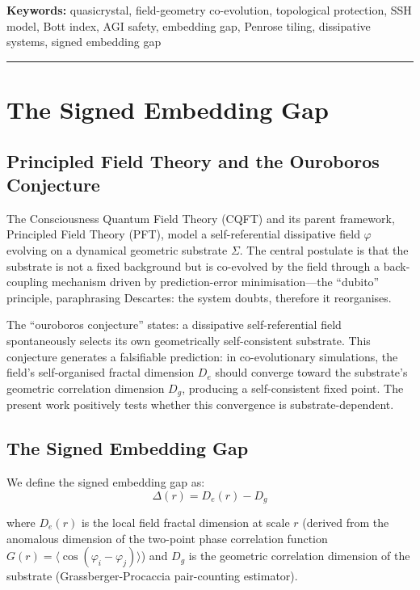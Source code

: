 \documentclass[11pt,a4paper]{article}
\begin{document}
\vspace{1em}
\noindent\textbf{Keywords:} quasicrystal, field-geometry co-evolution, topological protection, SSH model, Bott index, AGI safety, embedding gap, Penrose tiling, dissipative systems, signed embedding gap

\vspace{2em}
\hrule
\vspace{1em}

\section{The Signed Embedding Gap}

\subsection{Principled Field Theory and the Ouroboros Conjecture}

The Consciousness Quantum Field Theory (CQFT) and its parent framework, Principled Field Theory (PFT), model a self-referential dissipative field $\varphi$ evolving on a dynamical geometric substrate $\Sigma$. The central postulate is that the substrate is not a fixed background but is co-evolved by the field through a back-coupling mechanism driven by prediction-error minimisation---the ``dubito'' principle, paraphrasing Descartes: the system doubts, therefore it reorganises.

The ``ouroboros conjecture'' states: a dissipative self-referential field spontaneously selects its own geometrically self-consistent substrate. This conjecture generates a falsifiable prediction: in co-evolutionary simulations, the field's self-organised fractal dimension $D_e$ should converge toward the substrate's geometric correlation dimension $D_g$, producing a self-consistent fixed point. The present work positively tests whether this convergence is substrate-dependent.

\subsection{The Signed Embedding Gap}

We define the signed embedding gap as:
\begin{equation}
\Delta(r) = D_e(r) - D_g
\end{equation}

where $D_e(r)$ is the local field fractal dimension at scale $r$ (derived from the anomalous dimension of the two-point phase correlation function $G(r) = \langle\cos(\varphi_i - \varphi_j)\rangle$) and $D_g$ is the geometric correlation dimension of the substrate (Grassberger-Procaccia pair-counting estimator).
\end{document}
